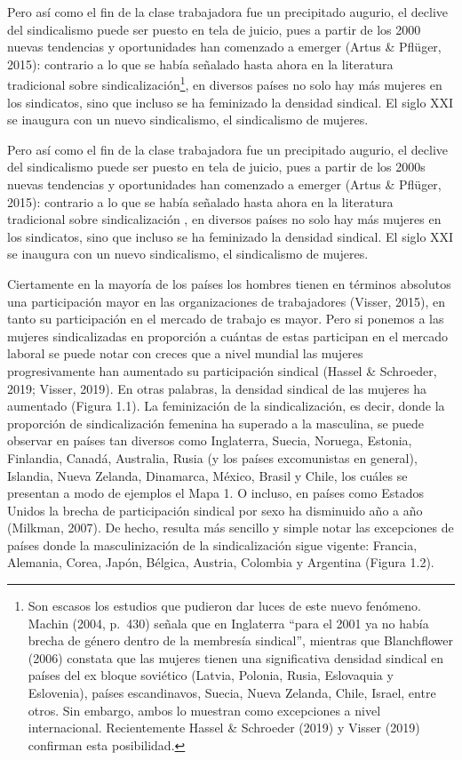 \documentclass[
]{book}
\begin{document}
Pero así como el fin de la clase trabajadora fue un precipitado augurio, el declive del sindicalismo puede ser puesto en tela de juicio, pues a partir de los 2000 nuevas tendencias y oportunidades han comenzado a emerger (Artus \& Pflüger, 2015): contrario a lo que se había señalado hasta ahora en la literatura tradicional sobre sindicalización\footnote{Son escasos los estudios que pudieron dar luces de este nuevo fenómeno. Machin (2004, p.~430) señala que en Inglaterra ``para el 2001 ya no había brecha de género dentro de la membresía sindical'', mientras que Blanchflower (2006) constata que las mujeres tienen una significativa densidad sindical en países del ex bloque soviético (Latvia, Polonia, Rusia, Eslovaquia y Eslovenia), países escandinavos, Suecia, Nueva Zelanda, Chile, Israel, entre otros. Sin embargo, ambos lo muestran como excepciones a nivel internacional. Recientemente Hassel \& Schroeder (2019) y Visser (2019) confirman esta posibilidad.}, en diversos países no solo hay más mujeres en los sindicatos, sino que incluso se ha feminizado la densidad sindical. El siglo XXI se inaugura con un nuevo sindicalismo, el sindicalismo de mujeres.

Pero así como el fin de la clase trabajadora fue un precipitado augurio, el declive del sindicalismo puede ser puesto en tela de juicio, pues a partir de los 2000s nuevas tendencias y oportunidades han comenzado a emerger (Artus \& Pflüger, 2015): contrario a lo que se había señalado hasta ahora en la literatura tradicional sobre sindicalización , en diversos países no solo hay más mujeres en los sindicatos, sino que incluso se ha feminizado la densidad sindical. El siglo XXI se inaugura con un nuevo sindicalismo, el sindicalismo de mujeres.

Ciertamente en la mayoría de los países los hombres tienen en términos absolutos una participación mayor en las organizaciones de trabajadores (Visser, 2015), en tanto su participación en el mercado de trabajo es mayor. Pero si ponemos a las mujeres sindicalizadas en proporción a cuántas de estas participan en el mercado laboral se puede notar con creces que a nivel mundial las mujeres progresivamente han aumentado su participación sindical (Hassel \& Schroeder, 2019; Visser, 2019). En otras palabras, la densidad sindical de las mujeres ha aumentado (Figura 1.1). La feminización de la sindicalización, es decir, donde la proporción de sindicalización femenina ha superado a la masculina, se puede observar en países tan diversos como Inglaterra, Suecia, Noruega, Estonia, Finlandia, Canadá, Australia, Rusia (y los países excomunistas en general), Islandia, Nueva Zelanda, Dinamarca, México, Brasil y Chile, los cuáles se presentan a modo de ejemplos el Mapa 1. O incluso, en países como Estados Unidos la brecha de participación sindical por sexo ha disminuido año a año (Milkman, 2007). De hecho, resulta más sencillo y simple notar las excepciones de países donde la masculinización de la sindicalización sigue vigente: Francia, Alemania, Corea, Japón, Bélgica, Austria, Colombia y Argentina (Figura 1.2).
\end{document}
